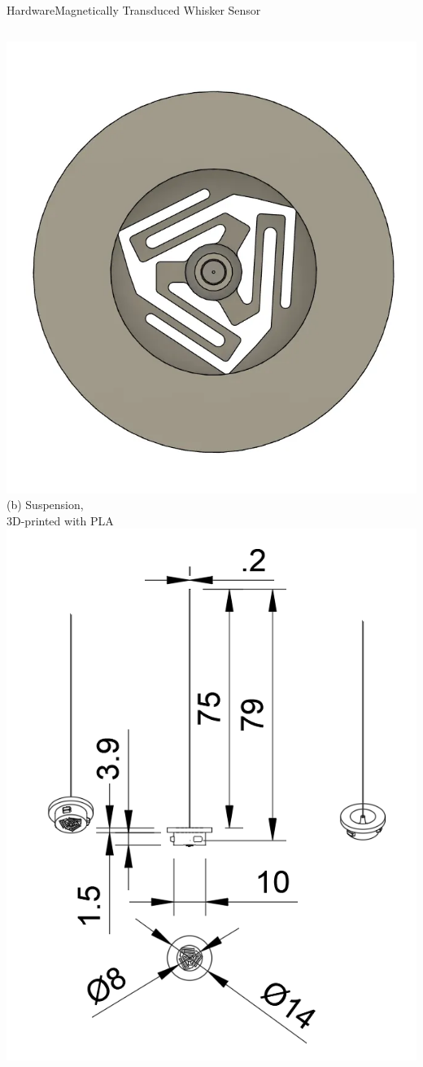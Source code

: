 \documentclass[AIRbeamer
,optEnglish
,optBiber
,optBibstyleAlphabetic
,optBeamerClassicFormat%
]{AIRlatex}
\begin{document}
\begin{frame}[c]{Hardware}{Magnetically Transduced Whisker Sensor}
\begin{columns}[c,onlytextwidth]
            \includegraphics[height=0.6\textheight]{figures/suspension}\\
            (b) Suspension,\\3D-printed with PLA
            \centering
            \includegraphics[height=0.6\textheight]{figures/whisker-dims}\\

\end{columns}
\end{frame}
\end{document}
